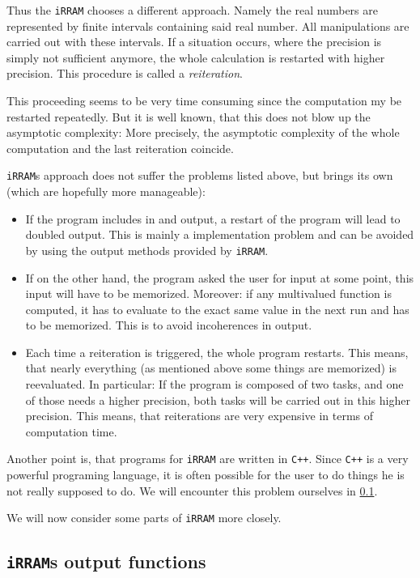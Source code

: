 \documentclass{article}
\newcommand{\irram}{\texttt{iRRAM}\xspace}
\newcommand{\irrams}{\texttt{iRRAM}s\xspace}
\newcommand{\cc}{\texttt{C++}\xspace}
\begin{document}
Thus the \irram chooses a different approach. Namely the real numbers are represented by finite intervals containing said real number. All manipulations are carried out with these intervals. If a situation occurs, where the precision is simply not sufficient anymore, the whole calculation is restarted with higher precision. This procedure is called a \emph{reiteration}.

This proceeding seems to be very time consuming since the computation my be restarted repeatedly. But it is well known, that this does not blow up the asymptotic complexity: More precisely, the asymptotic complexity of the whole computation and the last reiteration coincide.

\irrams approach does not suffer the problems listed above, but brings its own (which are hopefully more manageable):
\begin{itemize}
\item If the program includes in and output, a restart of the program will lead to doubled output. This is mainly a implementation problem and can be avoided by using the output methods provided by \irram.
\item If on the other hand, the program asked the user for input at some point, this input will have to be memorized. Moreover: if any multivalued function is computed, it has to evaluate to the exact same value in the next run and has to be memorized. This is to avoid incoherences in output.
\item Each time a reiteration is triggered, the whole program restarts. This means, that nearly everything (as mentioned above some things are memorized) is reevaluated. In particular: If the program is composed of two tasks, and one of those needs a higher precision, both tasks will be carried out in this higher precision. This means, that reiterations are very expensive in terms of computation time.
\end{itemize}

Another point is, that programs for \irram are written in \cc. Since \cc is a very powerful programing language, it is often possible for the user to do things he is not really supposed to do. We will encounter this problem ourselves in \ref{}.

We will now consider some parts of \irram more closely.

\subsection{\irrams output functions}
\end{document}
